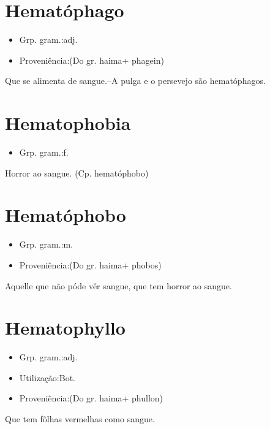 \documentclass{article}
\begin{document}
\section{Hematóphago}
\begin{itemize}
\item {Grp. gram.:adj.}
\end{itemize}
\begin{itemize}
\item {Proveniência:(Do gr. \textunderscore haima\textunderscore  + \textunderscore phagein\textunderscore )}
\end{itemize}
Que se alimenta de sangue.--A pulga e o persevejo são hematóphagos.
\section{Hematophobia}
\begin{itemize}
\item {Grp. gram.:f.}
\end{itemize}
Horror ao sangue.
(Cp. \textunderscore hematóphobo\textunderscore )
\section{Hematóphobo}
\begin{itemize}
\item {Grp. gram.:m.}
\end{itemize}
\begin{itemize}
\item {Proveniência:(Do gr. \textunderscore haima\textunderscore  + \textunderscore phobos\textunderscore )}
\end{itemize}
Aquelle que não póde vêr sangue, que tem horror ao sangue.
\section{Hematophyllo}
\begin{itemize}
\item {Grp. gram.:adj.}
\end{itemize}
\begin{itemize}
\item {Utilização:Bot.}
\end{itemize}
\begin{itemize}
\item {Proveniência:(Do gr. \textunderscore haima\textunderscore  + \textunderscore phullon\textunderscore )}
\end{itemize}
Que tem fôlhas vermelhas como sangue.
\end{document}
